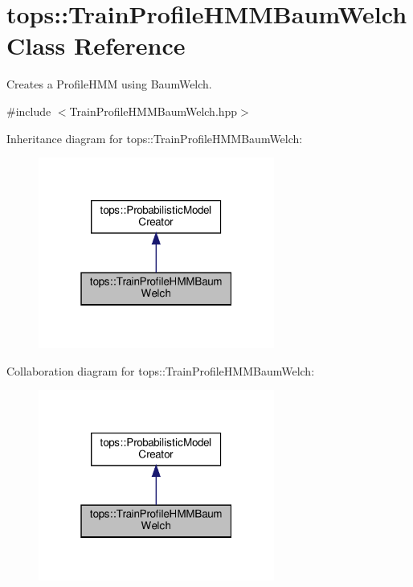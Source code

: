 \hypertarget{classtops_1_1TrainProfileHMMBaumWelch}{}\section{tops\+:\+:Train\+Profile\+H\+M\+M\+Baum\+Welch Class Reference}
\label{classtops_1_1TrainProfileHMMBaumWelch}


Creates a Profile\+H\+MM using Baum\+Welch.  




{\ttfamily \#include $<$Train\+Profile\+H\+M\+M\+Baum\+Welch.\+hpp$>$}



Inheritance diagram for tops\+:\+:Train\+Profile\+H\+M\+M\+Baum\+Welch\+:
\nopagebreak
\begin{figure}[H]
\begin{center}
\leavevmode
\includegraphics[width=220pt]{classtops_1_1TrainProfileHMMBaumWelch__inherit__graph}
\end{center}
\end{figure}


Collaboration diagram for tops\+:\+:Train\+Profile\+H\+M\+M\+Baum\+Welch\+:
\nopagebreak
\begin{figure}[H]
\begin{center}
\leavevmode
\includegraphics[width=220pt]{classtops_1_1TrainProfileHMMBaumWelch__coll__graph}
\end{center}
\end{figure}
